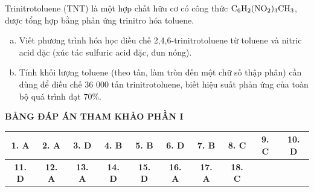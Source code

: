 \documentclass[12pt,a4paper]{article}
\begin{document}
\begin{ex}
Trinitrotoluene (TNT) là một hợp chất hữu cơ có công thức $\ce{C6H2(NO2)3CH3}$, được tổng hợp bằng phản ứng trinitro hóa toluene.
\begin{enumerate}[a)]
    \setlength\itemsep{0pt}
    \item Viết phương trình hóa học điều chế 2,4,6-trinitrotoluene từ toluene và nitric acid đặc (xúc tác sulfuric acid đặc, đun nóng).
    \item Tính khối lượng toluene (theo tấn, làm tròn đến một chữ số thập phân) cần dùng để điều chế 36 000 tấn trinitrotoluene, biết hiệu suất phản ứng của toàn bộ quá trình đạt 70\%.
\end{enumerate}


\end{ex}

\bigskip
\newpage
\noindent\textbf{\large BẢNG ĐÁP ÁN THAM KHẢO PHẦN I}
\vspace{0.2cm}

\noindent
\begin{center}
\begin{tabular}{|c|c|c|c|c|c|c|c|c|c|}
\hline
\textbf{1. A} & \textbf{2. A} & \textbf{3. D} & \textbf{4. B} & \textbf{5. B} & \textbf{6. D} & \textbf{7. B} & \textbf{8. C} & \textbf{9. C} & \textbf{10. D} \\
\hline
\textbf{11. D} & \textbf{12. A} & \textbf{13. A} & \textbf{14. D} & \textbf{15. D} & \textbf{16. A} & \textbf{17. A} & \textbf{18. C} & & \\
\hline
\end{tabular}
\end{center}
\end{document}
